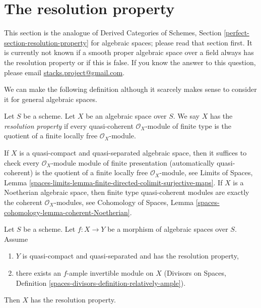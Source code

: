 \section{The resolution property}
\label{section-resolution-property}

\noindent
This section is the analogue of Derived Categories of Schemes, Section
\ref{perfect-section-resolution-property} for algebraic spaces; please
read that section first. It is currently not known if a smooth
proper algebraic space over a field always has the resolution property
or if this is false. If you know the answer to this question, please email
\href{mailto:stacks.project@gmail.com}{stacks.project@gmail.com}.

\medskip\noindent
We can make the following definition although it scarcely makes
sense to consider it for general algebraic spaces.

\begin{definition}
\label{definition-resolution-property}
Let $S$ be a scheme. Let $X$ be an algebraic space over $S$.
We say $X$ has the {\it resolution property} if every quasi-coherent
$\mathcal{O}_X$-module of finite type is the quotient of a
finite locally free $\mathcal{O}_X$-module.
\end{definition}

\noindent
If $X$ is a quasi-compact and quasi-separated algebraic space, then
it suffices to check every $\mathcal{O}_X$-module module of
finite presentation (automatically quasi-coherent) is the quotient
of a finite locally free $\mathcal{O}_X$-module, see
Limits of Spaces, Lemma
\ref{spaces-limits-lemma-finite-directed-colimit-surjective-maps}.
If $X$ is a Noetherian algebraic space, then finite type quasi-coherent modules
are exactly the coherent $\mathcal{O}_X$-modules, see
Cohomology of Spaces, Lemma \ref{spaces-cohomology-lemma-coherent-Noetherian}.

\begin{lemma}
\label{lemma-resolution-property-ample-relative}
Let $S$ be a scheme.
Let $f : X \to Y$ be a morphism of algebraic spaces over $S$. Assume
\begin{enumerate}
\item $Y$ is quasi-compact and quasi-separated and has the resolution property,
\item there exists an $f$-ample invertible module on $X$
(Divisors on Spaces, Definition
\ref{spaces-divisors-definition-relatively-ample}).
\end{enumerate}
Then $X$ has the resolution property.
\end{lemma}

